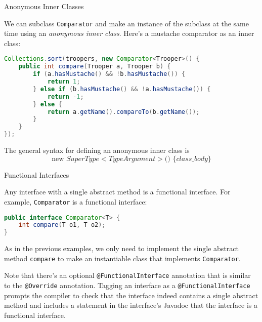 \documentclass{beamer}
\begin{document}
\begin{frame}[fragile]{Anonymous Inner Classes}

We can subclass {\tt Comparator} and make an instance of the subclass at the same time using an {\it anonymous inner class}.  Here's a mustache comparator as an inner class:

\begin{lstlisting}[language=Java]
Collections.sort(troopers, new Comparator<Trooper>() {
    public int compare(Trooper a, Trooper b) {
        if (a.hasMustache() && !b.hasMustache()) {
            return 1;
        } else if (b.hasMustache() && !a.hasMustache()) {
            return -1;
        } else {
            return a.getName().compareTo(b.getName());
        }
    }
});
\end{lstlisting}

The general syntax for defining an anonymous inner class is
\[
\text{new } SuperType<TypeArgument>\text{() } \{ class\_body \}
\]

\end{frame}

\begin{frame}[fragile]{Functional Interfaces}

Any interface with a single abstract method is a functional interface.  For example, {\tt Comparator} is a functional interface:

\begin{lstlisting}[language=Java]
public interface Comparator<T> {
    int compare(T o1, T o2);
}
\end{lstlisting}

As in the previous examples, we only need to implement the single abstract method {\tt compare} to make an instantiable class that implements {\tt Comparator}.\\

\vspace{.05in}

Note that there's an optional {\tt @FunctionalInterface} annotation that is similar to the {\tt @Override} annotation.  Tagging an interface as a {\tt @FunctionalInterface} prompts the compiler to check that the interface indeed contains a single abstract method and includes a statement in the interface's Javadoc that the interface is a functional interface.

\end{frame}
\end{document}
